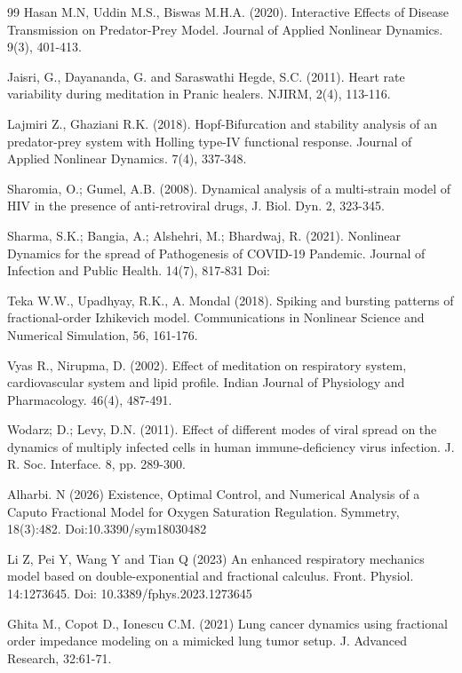 \documentclass[10pt]{NSP1}
\begin{document}
\begin{thebibliography}{99}
Hasan M.N, Uddin M.S., Biswas M.H.A. (2020). Interactive Eﬀects of Disease Transmission on Predator-Prey Model. Journal of Applied Nonlinear Dynamics. 9(3), 401-413.

Jaisri, G., Dayananda, G. and Saraswathi Hegde, S.C. (2011). Heart rate variability during meditation in Pranic healers. NJIRM, 2(4), 113-116.

Lajmiri Z., Ghaziani R.K. (2018). Hopf-Bifurcation and stability analysis of an predator-prey system with Holling type-IV functional response. Journal of Applied Nonlinear Dynamics. 7(4), 337-348.

Sharomia, O.; Gumel, A.B. (2008). Dynamical analysis of a multi-strain model of HIV in the presence of anti-retroviral drugs, J. Biol. Dyn. 2, 323-345.

Sharma, S.K.; Bangia, A.; Alshehri, M.;
Bhardwaj, R. (2021). Nonlinear Dynamics for the spread of Pathogenesis of COVID-19 Pandemic. Journal of Infection and Public Health. 14(7), 817-831 Doi:

Teka W.W., Upadhyay, R.K., A. Mondal (2018). Spiking and bursting patterns of fractional-order Izhikevich model. Communications in Nonlinear Science and Numerical Simulation, 56, 161-176.

Vyas R., Nirupma, D. (2002). Effect of meditation on respiratory system, cardiovascular system and lipid profile. Indian Journal of Physiology and Pharmacology. 46(4), 487-491.

Wodarz; D.; Levy, D.N. (2011). Effect of different modes of viral spread on the dynamics of multiply infected cells in human immune-deficiency virus infection. J. R. Soc. Interface. 8, pp. 289-300.

Alharbi. N (2026) Existence, Optimal Control, and Numerical Analysis of a Caputo Fractional Model for Oxygen Saturation Regulation. Symmetry, 18(3):482. Doi:10.3390/sym18030482

Li Z, Pei Y, Wang Y and Tian Q (2023) An enhanced respiratory mechanics model based on double-exponential and fractional calculus. Front. Physiol. 14:1273645. Doi: 10.3389/fphys.2023.1273645

Ghita M., Copot D., Ionescu C.M. (2021) Lung cancer dynamics using fractional order impedance modeling on a mimicked lung tumor setup. J. Advanced Research, 32:61-71.

\end{thebibliography}
\end{document}
